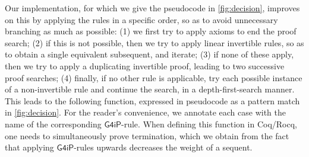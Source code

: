 \documentclass[english,final]{jflart}
\newcommand{\Coq}{{Coq/Rocq}}
\theoremstyle{definition}
\theoremstyle{plain}
\newcommand{\Gfourip}{\mathsf{G4iP}}
\newcommand{\sam}[1]{\textcolor{red}{#1}}
\begin{document}

Our implementation, for which we give the pseudocode in \cref{fig:decision}, improves on this by applying the rules in a specific order, so as to avoid unnecessary branching as much as possible: (1) we first try to apply axioms to end the proof search; (2) if this is not possible, then we try to apply linear invertible rules, so as to obtain a single equivalent subsequent, and iterate; (3) if none of these apply, then we try to apply a duplicating invertible proof, leading to two successive proof searches; (4) finally, if no other rule is applicable, try each possible instance of a non-invertible rule and continue the search, in a depth-first-search manner. This leads to the following function, expressed in pseudocode as a pattern match in \cref{fig:decision}. For the reader's convenience, we annotate each case with the name of the corresponding $\Gfourip$-rule. When defining this function in {\Coq}, one needs to simultaneously prove termination, which we obtain from the fact that applying $\Gfourip$-rules upwards decreases the weight of a sequent. 
\end{document}
